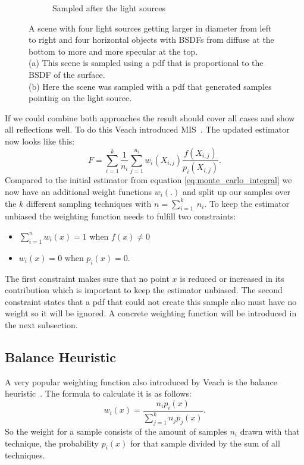\begin{figure}
\begin{subfigure}[b]{0.4\textwidth}
        \caption{Sampled after the light sources}
        \label{fig:veach_mis_light}
    \end{subfigure}
    \caption{A scene with four light sources getting larger in diameter from left to right
    and four horizontal objects with BSDFs from diffuse at the bottom to more and more specular at the top.\\
    (a) This scene is sampled using a pdf that is proportional to the BSDF of the surface.\\
    (b) Here the scene was sampled with a pdf that generated samples pointing on the light source.
    \cite[Figure~9.2]{veach-thesis}}
    \label{fig:veach_mis_single}
\end{figure}

If we could combine both approaches the result should cover all cases and show all reflections well.
To do this Veach introduced MIS~\cite[Chapter~9]{veach-thesis}.
The updated estimator now looks like this:
\begin{equation}
    \label{eq:mis_estimator}
    F = \sum_{i = 1}^k \frac{1}{n_i} \sum_{j = 1}^{n_i} w_i(X_{i,j}) \frac{f(X_{i,j})}{p_i(X_{i,j})}.
\end{equation}
Compared to the initial estimator from equation \ref{eq:monte_carlo_integral} we now have an additional weight functions $ w_i(.) $
and split up our samples over the $ k $ different sampling techniques with $ n = \sum_{i = 1}^k~n_i $.
To keep the estimator unbiased the weighting function needs to fulfill two constraints:
\begin{itemize}
    \item $ \sum_{i = 1}^n w_i(x) = 1 $ when $ f(x) \neq 0 $
    \item $ w_i(x) = 0 $ when $ p_i(x) = 0 $.
\end{itemize}
The first constraint makes sure that no point $ x $ is reduced or increased in its contribution
which is important to keep the estimator unbiased.
The second constraint states that a pdf that could not create this sample also must have no weight
so it will be ignored.
A concrete weighting function will be introduced in the next subsection.


\subsection{Balance Heuristic}
\label{sec:balance_heuristic}
A very popular weighting function also introduced by Veach is the balance heuristic~\cite[Chapter~9.2.2]{veach-thesis}.
The formula to calculate it is as follows:
\begin{equation}
    \label{eq:balance_weighting}
    w_i(x) = \frac{n_i p_i(x)}{\sum_{j = 1}^k n_j p_j(x)}.
\end{equation}
So the weight for a sample consists of the amount of samples $ n_i $ drawn with that technique,
the probability $ p_i(x) $ for that sample divided by the sum of all techniques.

